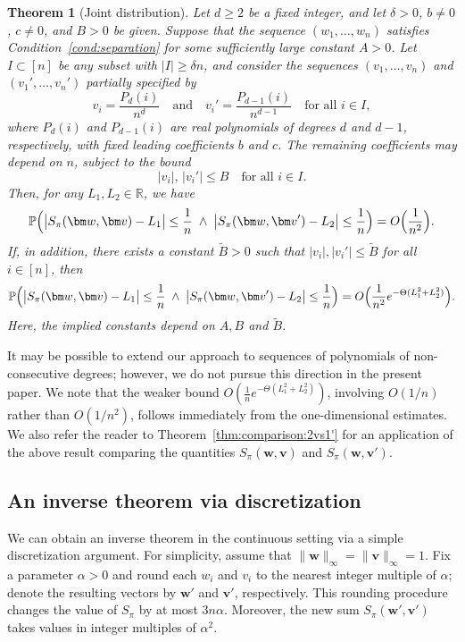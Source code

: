 \documentclass[reqno]{amsart}
\newcommand\R{{\mathbb{R}}}
\renewcommand\P{{\mathbb{P}}}
\newcommand\BMv{{\bm v}}
\newcommand\BMw{{\bm w}}
\theoremstyle{plain}
\newtheorem{theorem}{Theorem}[section]
\theoremstyle{definition}
\begin{document}
\begin{theorem}[Joint distribution]\label{thm:comparison:2vs1}
Let $d\ge2$ be a fixed integer, and let $\delta>0$, $b\neq0$, $c\neq0$, and
$B>0$ be given. Suppose that the sequence $(w_1,\ldots,w_n)$ satisfies
Condition~\ref{cond:separation} for some sufficiently large constant $A>0$.
Let $I\subset[n]$ be any subset with $|I|\ge \delta n$, and consider the
sequences $(v_1,\ldots,v_n)$ and $(v_1',\ldots,v_n')$ partially specified by
\[
v_i=\frac{P_d(i)}{n^{d}}
\quad\text{and}\quad
v_i'=\frac{P_{d-1}(i)}{n^{d-1}}
\quad \text{for all } i\in I,
\]
where $P_d(i)$ and $P_{d-1}(i)$ are real polynomials of degrees $d$ and $d-1$,
respectively, with fixed leading coefficients $b$ and $c$. The remaining
coefficients may depend on $n$, subject to the bound
\[
|v_i|,\,|v_i'|\le B \quad \text{for all } i\in I.
\]
Then, for any $L_1,L_2\in\R$, we have
\begin{equation}\label{eqn:comparison:u}
\P\Bigl(
\bigl|S_{\pi}(\BMw,\BMv)-L_1\bigr|\le \frac{1}{n}
\;\wedge\;
\bigl|S_{\pi}(\BMw,\BMv')-L_2\bigr|\le \frac{1}{n}
\Bigr)
= O\Big(\frac{1}{n^2}\Big).
\end{equation}
If, in addition, there exists a constant $\widetilde{B}>0$ such that
$|v_i|,|v_i'|\le \widetilde{B}$ for all $i\in[n]$, then
\begin{equation}\label{eqn:comparison:L}
\P\Bigl(
\bigl|S_{\pi}(\BMw,\BMv)-L_1\bigr|\le \frac{1}{n}
\;\wedge\;
\bigl|S_{\pi}(\BMw,\BMv')-L_2\bigr|\le \frac{1}{n}
\Bigr)
= O\Big(\frac{1}{n^2} e^{-\Theta(L_1^2+L_2^2)}\Big).
\end{equation}
Here, the implied constants depend on $A,B$ and $\widetilde{B}$.
\end{theorem}

It may be possible to extend our approach to sequences of polynomials of
non-consecutive degrees; however, we do not pursue this direction in the
present paper. We note that the weaker bound
$O(\frac{1}{n} e^{-\Theta(L_1^2+L_2^2)})$,
involving $O(1/n)$ rather than $O(1/n^2)$, follows immediately from the
one-dimensional estimates. We also refer the reader to
Theorem~\ref{thm:comparison:2vs1'} for an application of the above result
comparing the quantities $S_{\pi}(\BMw,\BMv)$ and $S_{\pi}(\BMw,\BMv')$.



\subsection{An inverse theorem via 
discretization}  We can obtain an inverse theorem in the continuous setting via a simple
discretization argument. For simplicity, assume that
$\|\BMw\|_{\infty}=\|\BMv\|_{\infty}=1$.
Fix a parameter $\alpha>0$ and round each $w_i$ and $v_i$ to the nearest integer
multiple of $\alpha$; denote the resulting vectors by $\BMw'$ and $\BMv'$,
respectively. This rounding procedure changes the value of $S_{\pi}$ by at most
$3n\alpha$. Moreover, the new sum $S_{\pi}(\BMw',\BMv')$ takes values in integer
multiples of $\alpha^2$.
\end{document}
